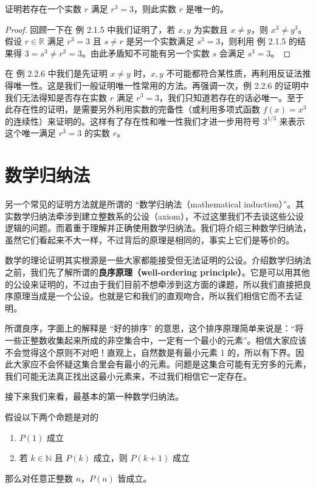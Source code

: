 \begin{example}
证明若存在一个实数 $r$ 满足 $r^3 = 3$，则此实数 $r$ 是唯一的。
\end{example}

\begin{proof}
回顾一下在 例 2.1.5 中我们证明了，若 $x, y$ 为实数且 $x \neq y$，则 $x^3 \neq y^3$。假设 $r \in \mathbb{R}$ 满足 $r^3 = 3$ 且 $s \neq r$ 是另一个实数满足 $s^3 = 3$，则利用 例 2.1.5 的结果得 $3 = s^3 \neq r^3 = 3$。由此矛盾知不可能有另一个实数 $s$ 会满足 $s^3 = 3$。
\end{proof}

在 例 2.2.6 中我们是先证明 $x \neq y$ 时，$x, y$ 不可能都符合某性质，再利用反证法推得唯一性。这是我们一般证明唯一性常用的方法。再强调一次，例 2.2.6 的证明中我们无法得知是否存在实数 $r$ 满足 $r^3 = 3$，我们只知道若存在的话必唯一。至于此存在性的证明，是需要另外利用实数的完备性（或利用多项式函数 $f(x) = x^3$ 的连续性）来证明的。这样有了存在性和唯一性我们才进一步用符号 $3^{1/3}$ 来表示这个唯一满足 $r^3 = 3$ 的实数 $r$。

\section{数学归纳法}

另一个常见的证明方法就是所谓的 “数学归纳法（mathematical induction）”。其实数学归纳法牵涉到建立整数系的公设（axiom），不过这里我们不去谈这些公设逻辑的问题。而着重于理解并正确使用数学归纳法。我们将介绍三种数学归纳法，虽然它们看起来不大一样，不过背后的原理是相同的，事实上它们是等价的。

数学的理论证明其实根源是一些大家都能接受但无法证明的公设。介绍数学归纳法之前，我们先了解所谓的\textbf{良序原理（well-ordering principle）}。它是可以用其他的公设来证明的，不过由于我们目前不想牵涉到这方面的课题，所以我们直接把良序原理当成是一个公设。也就是它和我们的直观吻合，所以我们相信它而不去证明。

所谓良序，字面上的解释是 “好的排序” 的意思，这个排序原理简单来说是：“将一些正整数收集起来所成的非空集合中，一定有一个最小的元素”。相信大家应该不会觉得这个原则不对吧！直观上，自然数是有最小元素 1 的，所以有下界。因此大家应不会怀疑这集合里会有最小的元素。问题是这集合可能有无穷多的元素，我们可能无法真正找出这最小元素来，不过我们相信它一定存在。

接下来我们来看，最基本的第一种数学归纳法。

\begin{theorem}[数学归纳法]
假设以下两个命题是对的
\begin{enumerate}
    \item[(I1)] $P(1)$ 成立
    \item[(I2)] 若 $k \in \mathbb{N}$ 且 $P(k)$ 成立，则 $P(k+1)$ 成立
\end{enumerate}
那么对任意正整数 $n$，$P(n)$ 皆成立。
\end{theorem}

